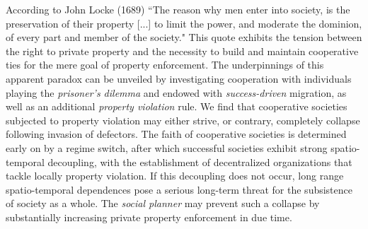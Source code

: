 According to John Locke (1689) ``The reason why men enter into society, is the preservation of their property [...] to limit the power, and moderate the dominion, of every part and member of the society." \cite{locke2014second} This quote exhibits the tension between the right to private property and the necessity to build and maintain cooperative ties for the mere goal of property enforcement. The underpinnings of this apparent paradox can be unveiled by investigating cooperation with individuals playing the {\it prisoner's dilemma} and endowed with {\it success-driven} migration, as well as an additional {\it property violation} rule. We find that cooperative societies subjected to property violation may either strive, or contrary, completely collapse following invasion of defectors. The faith of cooperative societies is determined early on by a regime switch, after which successful societies exhibit strong spatio-temporal decoupling, with the establishment of decentralized organizations that tackle locally property violation. If this decoupling does not occur, long range spatio-temporal dependences pose a serious long-term threat for the subsistence of society as a whole. The {\it social planner} may prevent such a collapse by substantially increasing private property enforcement in due time.